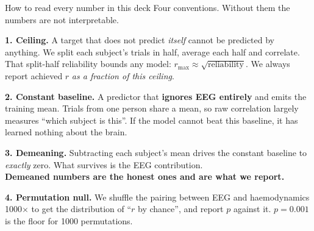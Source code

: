 \documentclass[aspectratio=169,11pt]{beamer}
\begin{document}
\begin{frame}{How to read every number in this deck}
Four conventions. Without them the numbers are not interpretable.

\vspace{0.4em}
\textbf{1. Ceiling.} A target that does not predict \emph{itself} cannot be
predicted by anything. We split each subject's trials in half, average each half
and correlate. That split-half reliability bounds any model:
$r_{\max}\approx\sqrt{\text{reliability}}$. We always report achieved $r$
\emph{as a fraction of this ceiling}.

\vspace{0.4em}
\textbf{2. Constant baseline.} A predictor that \textbf{ignores EEG entirely} and
emits the training mean. Trials from one person share a mean, so raw correlation
largely measures ``which subject is this''. If the model cannot beat this
baseline, it has learned nothing about the brain.

\vspace{0.4em}
\textbf{3. Demeaning.} Subtracting each subject's mean drives the constant
baseline to \emph{exactly} zero. What survives is the EEG contribution. \\
\textbf{Demeaned numbers are the honest ones and are what we report.}

\vspace{0.4em}
\textbf{4. Permutation null.} We shuffle the pairing between EEG and
haemodynamics 1000$\times$ to get the distribution of ``$r$ by chance'', and
report $p$ against it. $p=0.001$ is the floor for 1000 permutations.
\end{frame}

\end{document}
